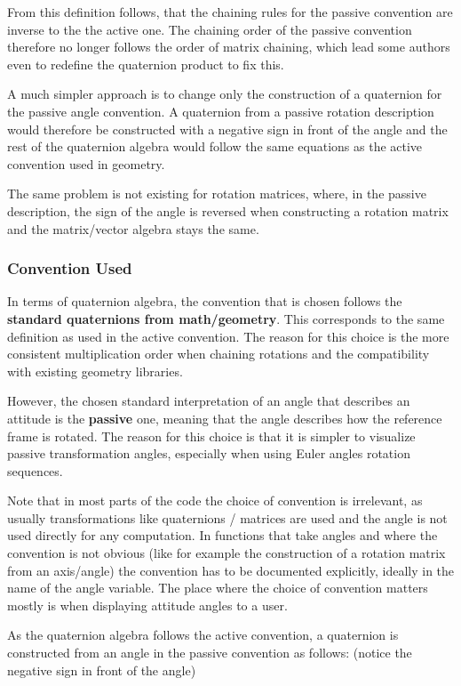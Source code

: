 \documentclass[a4paper]{paper}
\begin{document}
From this definition follows, that the chaining rules for the passive convention are inverse to the the active one. The chaining order of the passive convention therefore no longer follows the order of matrix chaining, which lead some authors \cite{markley_quaternion} even to redefine the quaternion product to fix this.

A much simpler approach is to change only the construction of a quaternion for the passive angle convention. A quaternion from a passive rotation description would therefore be constructed with a negative sign in front of the angle and the rest of the quaternion algebra would follow the same equations as the active convention used in geometry.

The same problem is not existing for rotation matrices, where, in the passive description, the sign of the angle is reversed when constructing a rotation matrix and the matrix/vector algebra stays the same.

\subsubsection{Convention Used}

In terms of quaternion algebra, the convention that is chosen follows the \textbf{standard quaternions from math/geometry}. This corresponds to the same definition as used in the active convention.
The reason for this choice is the more consistent multiplication order when chaining rotations and the compatibility with existing geometry libraries.

However, the chosen standard interpretation of an angle that describes an attitude is the \textbf{passive} one, meaning that the angle describes how the reference frame is rotated.
The reason for this choice is that it is simpler to visualize passive transformation angles, especially when using Euler angles rotation sequences.

Note that in most parts of the code the choice of convention is irrelevant, as usually transformations like quaternions / matrices are used and the angle is not used directly for any computation.
In functions that take angles and where the convention is not obvious (like for example the construction of a rotation matrix from an axis/angle) the convention has to be documented explicitly, ideally in the name of the angle variable.
The place where the choice of convention matters mostly is when displaying attitude angles to a user.

As the quaternion algebra follows the active convention, a quaternion is constructed from an angle in the passive convention as follows: (notice the negative sign in front of the angle)
\end{document}
